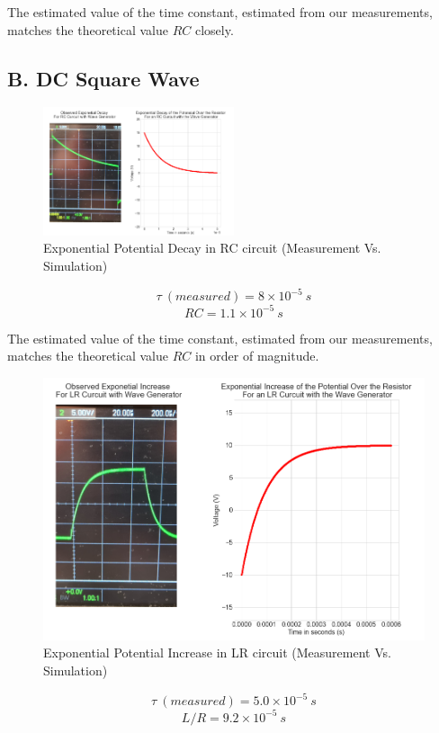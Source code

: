 \documentclass[a4paper,12pt]{article}
\begin{document}
The estimated value of the time constant, estimated from our measurements, matches the theoretical value $RC$ closely. 

\subsection*{B. DC Square Wave}

\begin{figure}[H]
  \centerline{\includegraphics[width=0.5\textwidth]{../Simulated Curves/RC_W-mod.png}}
  \caption{Exponential Potential Decay in RC circuit (Measurement Vs. Simulation)}
  \label{Combined_RC_W}
\end{figure}
$$\tau\ (measured) = 8 \times 10^{-5}\ s$$
$$RC = 1.1 \times 10^{-5}\ s$$

The estimated value of the time constant, estimated from our measurements, matches the theoretical value $RC$ in order of magnitude. 

\begin{figure}[H]
  \centerline{\includegraphics[width=0.75\linewidth]{../Simulated Curves/LR_W-mod.png}}
  \caption{Exponential Potential Increase in LR circuit (Measurement Vs. Simulation)}
  \label{Combined_LR_W}
\end{figure}
$$\tau\ (measured) = 5.0 \times 10^{-5}\ s$$
$$L/R = 9.2 \times 10^{-5}\ s$$
\end{document}
